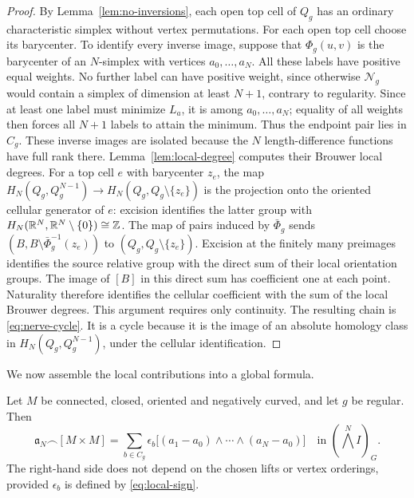\begin{proof}
By Lemma~\ref{lem:no-inversions}, each open top
cell of $Q_g$ has an ordinary characteristic
simplex without vertex permutations. For each open top cell choose its barycenter.
To identify every inverse image, suppose that
$\Phi_g(u,v)$ is the barycenter of an $N$-simplex
with vertices $a_0,\ldots,a_N$. All these labels
have positive equal weights. No further label
can have positive weight, since otherwise
$\mathcal N_g$ would contain a simplex of dimension
at least $N+1$, contrary to regularity. Since
at least one label must minimize $L_a$, it is
among $a_0,\ldots,a_N$; equality of all weights
then forces all $N+1$ labels to attain the
minimum. Thus the endpoint pair lies in $C_g$.
These inverse images are isolated because
the $N$ length-difference functions have full
rank there. Lemma~\ref{lem:local-degree} computes
their Brouwer local degrees. For a top cell $e$ with barycenter $z_e$, the map
$H_N(Q_g,Q_g^{N-1})\to H_N(Q_g,Q_g\setminus\{z_e\})$
is the projection onto the oriented cellular generator
of $e$: excision identifies the latter group with
$H_N(\mathbb{R}^N,\mathbb{R}^N\setminus\{0\})\cong\mathbb{Z}$.
The map of pairs induced by $\bar\Phi_g$ sends
$(B,B\setminus\bar\Phi_g^{-1}(z_e))$ to
$(Q_g,Q_g\setminus\{z_e\})$.
Excision at the finitely many preimages identifies
the source relative group with the direct sum of
their local orientation groups. The image of $[B]$
in this direct sum has coefficient one at each point.
Naturality therefore identifies the cellular coefficient
with the sum of the local Brouwer degrees.
This argument requires only continuity.
The resulting chain is \eqref{eq:nerve-cycle}.
It is a cycle because it is the image of an absolute
homology class in $H_N(Q_g,Q_g^{N-1})$, under the
cellular identification.
\end{proof}

We now assemble the local contributions into a global formula.

\begin{theorem}\label{thm:localization}
Let $M$ be connected, closed, oriented and negatively curved,
and let $g$ be regular. Then
\begin{equation}\label{eq:localization}
 \mathfrak a_N\frown[M\times M]
 =\sum_{b\in C_g}\epsilon_b
 \big[(a_1-a_0)\wedge\cdots\wedge(a_N-a_0)\big]
 \quad\text{in }(\bigwedge^N I)_G.
\end{equation}
The right-hand side does not depend on the
chosen lifts or vertex orderings, provided
$\epsilon_b$ is defined by \eqref{eq:local-sign}.
\end{theorem}

